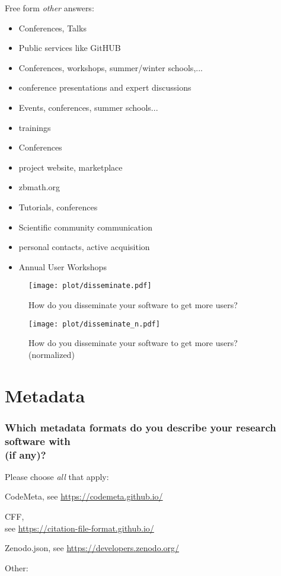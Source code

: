 \documentclass[headsepline,titlepage,twoside,12pt,toc=flat,headings=normal]{scrreprt}
\newcommand{\question}[1]{\subsubsection{#1}}
\newcommand{\otherbox}{\fbox{\phantom{This is how big an answer would be.}}}
\begin{document}
Free form \emph{other} answers:
\begin{itemize}
\item Conferences, Talks
\item Public services like GitHUB
\item Conferences, workshops, summer/winter schools,...
\item conference presentations and expert discussions
\item Events, conferences, summer schools...
\item trainings
\item Conferences
\item project website, marketplace
\item zbmath.org
\item Tutorials, conferences
\item Scientific community communication
\item personal contacts, active acquisition
\item Annual User Workshops
\end{itemize}

\begin{figure}[h!]
\caption[Software dissemination]{How do you disseminate your software to get more users?}
\label{fig:disseminate}
\texttt{[image: plot/disseminate.pdf]}
\end{figure}

\begin{figure}[h!]
\caption[Software dissemination (normalized)]{How do you disseminate your software to get more users? (normalized)}
\label{fig:disseminate_n}
\texttt{[image: plot/disseminate\_n.pdf]}
\end{figure}

\clearpage
\section{Metadata}
\question{Which metadata formats do you describe your research software with\\(if any)?}\label{which-metadata-formats-do-you-describe-your-research-software-with-if-any}
Please choose \emph{all} that apply:

\begin{answers}
\item CodeMeta, see \url{https://codemeta.github.io/}
\item \acf{CFF},\\see \url{https://citation-file-format.github.io/}
\item Zenodo.json, see \url{https://developers.zenodo.org/}
\item Other: \otherbox
\end{answers}
\end{document}
